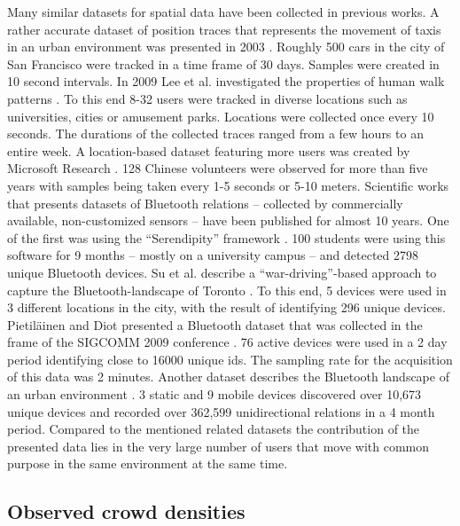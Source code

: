 \documentclass[12pt,a4paper,twoside,openright]{book}
\begin{document}
Many similar datasets for spatial data have been collected in previous works.
%
A rather accurate dataset of position traces that represents the movement of taxis in an urban environment was presented in 2003 \cite{jetcheva2003}.
%
Roughly 500 cars in the city of San Francisco were tracked in a time frame of 30 days.
%
Samples were created in 10 second intervals.
%
In 2009 Lee et al. investigated the properties of human walk patterns \cite{lee2009}.
%
To this end 8-32 users were tracked in diverse locations such as universities, cities or amusement parks.
%
Locations were collected once every 10 seconds.
%
The durations of the collected traces ranged from a few hours to an entire week.
%
A location-based dataset featuring more users was created by Microsoft Research \cite{zheng2008}.
%
128 Chinese volunteers were observed for more than five years with samples being taken every 1-5 seconds or 5-10 meters.
%
Scientific works that presents datasets of Bluetooth relations -- collected by commercially available, non-customized sensors -- have been published for almost 10 years.
%
One of the first was using the ``Serendipity'' framework \cite{eagle2005}.
%
100 students were using this software for 9 months -- mostly on a university campus -- and detected 2798 unique Bluetooth devices.
%
Su et al. describe a ``war-driving''-based approach to capture the Bluetooth-landscape of Toronto \cite{Su2006}.
%
To this end, 5 devices were used in 3 different locations in the city, with the result of identifying 296 unique devices.
%
Pietil\"{a}inen and Diot presented a Bluetooth dataset that was collected in the frame of the SIGCOMM 2009 conference \cite{Pietilainen2012}.
%
76 active devices were used in a 2 day period identifying close to 16000 unique ids.
%
The sampling rate for the acquisition of this data was 2 minutes.
%
Another dataset describes the Bluetooth landscape of an urban environment \cite{Natarajan2007}.
%
3 static and 9 mobile devices discovered over 10,673 unique devices and recorded over 362,599 unidirectional relations in a 4 month period.
%
Compared to the mentioned related datasets the contribution of the presented data lies in the very large number of users that move with common purpose in the same environment at the same time.

\subsection{Observed crowd densities}
\label{subsec:observed-densities}
\end{document}
